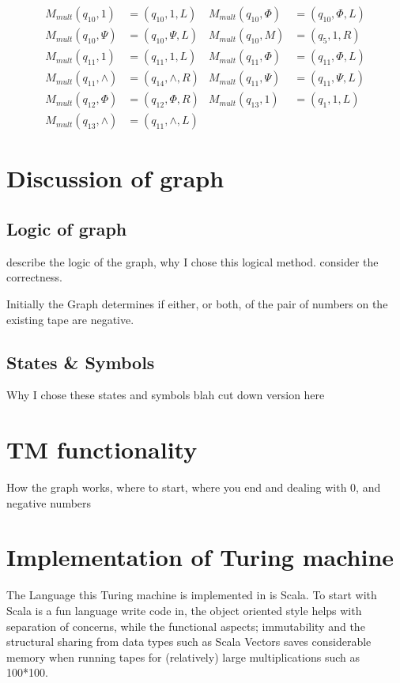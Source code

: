 \documentclass[11pt]{article}
\begin{document}
\begin{align*}
M_{mult}(q_{10}, 1) &= (q_{10}, 1, L)	&	M_{mult}(q_{10}, \Phi) &= (q_{10}, \Phi, L) \\
M_{mult}(q_{10}, \Psi) &= (q_{10}, \Psi, L)	&	M_{mult}(q_{10}, M) &= (q_{5}, 1, R) \\
M_{mult}(q_{11}, 1) &= (q_{11}, 1, L)	&	M_{mult}(q_{11}, \Phi) &= (q_{11}, \Phi, L) \\
M_{mult}(q_{11}, \wedge) &= (q_{14}, \wedge, R)	 & M_{mult}(q_{11}, \Psi) &= (q_{11}, \Psi, L) \\
M_{mult}(q_{12}, \Phi) &= (q_{12}, \Phi, R) & M_{mult}(q_{13}, 1) &= (q_{1}, 1, L) \\
M_{mult}(q_{13}, \wedge) &= (q_{11}, \wedge, L)
\end{align*}

\section{Discussion of graph}
\subsection{Logic of graph}
describe the logic of the graph, why I chose this logical method. consider the correctness.

Initially the Graph determines if either, or both, of the pair of numbers on the existing tape are negative.

\subsection{States \& Symbols}
Why I chose these states and symbols
blah
cut down version here

\section{TM functionality}
How the graph works, where to start, where you end and dealing with 0, and negative numbers

\section{Implementation of Turing machine}

The Language this Turing machine is implemented in is Scala. To start with Scala is a fun language write code in, the object oriented style helps with separation of concerns, while the functional aspects; immutability and the structural sharing from data types such as Scala Vectors saves considerable memory when running tapes for (relatively) large multiplications such as 100*100.
\end{document}
